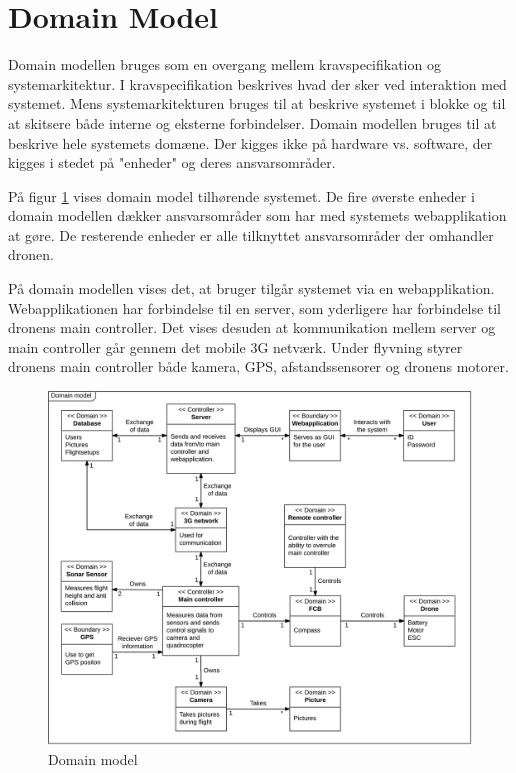\section{Domain Model}

Domain modellen bruges som en overgang mellem kravspecifikation og systemarkitektur. 
I kravspecifikation beskrives hvad der sker ved interaktion med systemet. Mens systemarkitekturen bruges til at beskrive systemet i blokke og til at skitsere både interne og eksterne forbindelser. Domain modellen bruges til at beskrive hele systemets domæne. Der kigges ikke på hardware vs. software, der kigges i stedet på "enheder" og deres ansvarsområder.

På figur \ref{fig:domain_model} vises domain model tilhørende systemet. De fire øverste enheder i domain modellen dækker ansvarsområder som har med systemets webapplikation at gøre. De resterende enheder er alle tilknyttet ansvarsområder der omhandler dronen.

På domain modellen vises det, at bruger tilgår systemet via en webapplikation. Webapplikationen har forbindelse til en server, som yderligere har forbindelse til dronens main controller. Det vises desuden at kommunikation mellem server og main controller går gennem det mobile 3G netværk. Under flyvning styrer dronens main controller både kamera, GPS, afstandssensorer og dronens motorer. 

\vspace{-5pt}
\begin{figure}[H]
	\centering
	\includegraphics[width=1.\textwidth]{Billeder/domain_model.png}
	\caption{Domain model}
	\label{fig:domain_model}
\end{figure}

